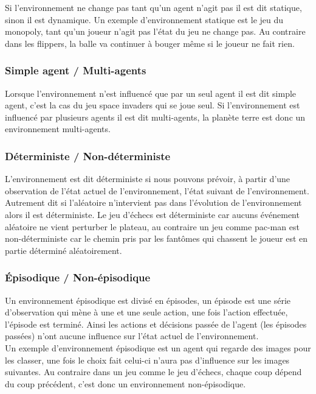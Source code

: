 \documentclass{article}
\begin{document}
Si l'environnement ne change pas tant qu'un agent n'agit pas il est dit statique, sinon il est dynamique. Un exemple d'environnement statique est le jeu du monopoly, tant qu'un joueur n'agit pas l'état du jeu ne change pas. Au contraire dans les flippers, la balle va continuer à bouger même si le joueur ne fait rien\cite{tutoptai}.

\subsubsection{Simple agent / Multi-agents}

Lorsque l'environnement n'est influencé que par un seul agent il est dit simple agent, c'est la cas du jeu space invaders qui se joue seul. Si l'environnement est influencé par plusieurs agents il est dit multi-agents, la planète terre est donc un environnement multi-agents\cite{tutoptai}.

\subsubsection{Déterministe / Non-déterministe}

L'environnement est dit déterministe si nous pouvons prévoir, à partir d'une observation de l'état actuel de l'environnement, l'état suivant de l'environnement. Autrement dit si l'aléatoire n'intervient pas dans l'évolution de l'environnement alors il est déterministe\cite{tutoptai}. Le jeu d'échecs est déterministe car aucuns événement aléatoire ne vient perturber le plateau, au contraire un jeu comme pac-man est non-déterministe car le chemin pris par les fantômes qui chassent le joueur est en partie déterminé aléatoirement.

\subsubsection{Épisodique / Non-épisodique}

Un environnement épisodique est divisé en épisodes, un épisode est une série d'observation qui mène à une et une seule action, une fois l'action effectuée, l'épisode est terminé. Ainsi les actions et décisions passée de l'agent (les épisodes passées) n'ont aucune influence sur l'état actuel de l'environnement.\\
Un exemple d'environnement épisodique est un agent qui regarde des images pour les classer, une fois le choix fait celui-ci n'aura pas d'influence sur les images suivantes. Au contraire dans un jeu comme le jeu d'échecs, chaque coup dépend du coup précédent, c'est donc un environnement non-épisodique\cite{tutoptai}.
\end{document}
